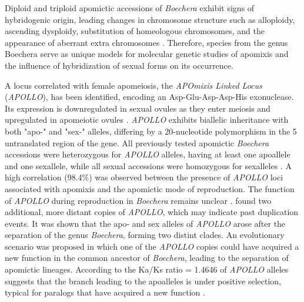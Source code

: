 \documentclass[9pt,twocolumn,twoside,lineno]{gsag3jnl}
\begin{document}
Diploid and triploid apomictic accessions of \textit{Boechera} exhibit signs of hybridogenic origin, leading changes in chromosome structure such as alloploidy, ascending dysploidy, substitution of homeologous chromosomes, and the appearance of aberrant extra chromosomes \citep{mandakova2016chromosome, brukhin2019}. Therefore, species from the genus Boechera serve as  unique models for molecular genetic studies of apomixis and the influence of hybridization of sexual forms on its occurrence.

A locus correlated with female apomeiosis, the \textit{APOmixis Linked Locus} (\textit{APOLLO}), has been identified, encoding an Asp-Glu-Asp-Asp-His exonuclease. Its expression is downregulated in sexual ovules as they enter meiosis and upregulated in apomeiotic ovules \citep{corral2013, bakin2022phylogenetic}. \textit{APOLLO} exhibits biallelic inheritance with both "apo-" and "sex-" alleles, differing by a 20-nucleotide polymorphism in the 5\textquotesingle{} untranslated region of the gene. All previously tested apomictic \textit{Boechera} accessions were heterozygous for \textit{APOLLO} alleles, having at least one apoallele and one sexallele, while all sexual accessions were homozygous for sexalleles \citep{corral2013, kliver2018, brukhin2019, bakin2022phylogenetic}. A high correlation (98.4\%) was observed between the presence of \textit{APOLLO} loci associated with apomixis and the apomictic mode of reproduction. The function of \textit{APOLLO} during reproduction in \textit{Boechera} remains unclear \citep{brukhin2019}. \cite{kliver2018} found two additional, more distant copies of \textit{APOLLO}, which may indicate past duplication events. It was shown that the apo- and sex alleles of \textit{APOLLO} arose after the separation of the genus \textit{Boechera}, forming two distint clades. An evolutionary scenario was proposed in which one of the \textit{APOLLO} copies could have acquired a new function in the common ancestor of \textit{Boechera}, leading to the separation of apomictic lineages. According to the Ka/Ks ratio = 1.4646 of \textit{APOLLO} alleles suggests that the branch leading to the apoalleles is under positive selection, typical for paralogs that have acquired a new function \citep{kliver2018, brukhin2019}.
\end{document}
